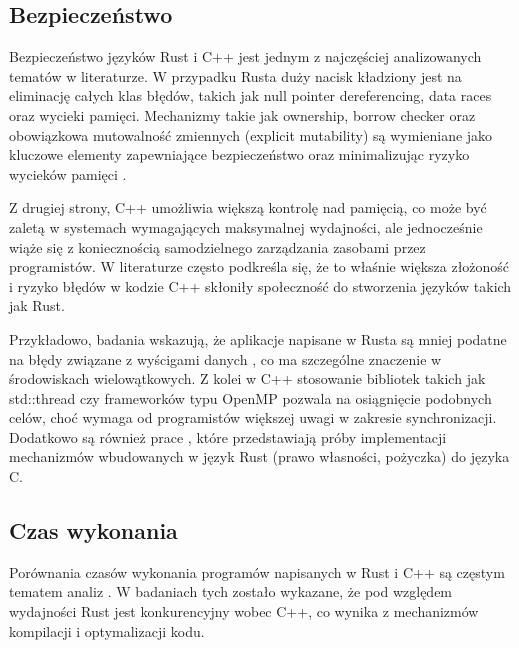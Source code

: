 \subsection{Bezpieczeństwo}
\label{Bezpieczeństwo}
Bezpieczeństwo języków Rust i C++ jest jednym z najczęściej analizowanych tematów w literaturze. W przypadku Rusta duży nacisk kładziony jest na eliminację całych klas błędów, takich jak null pointer dereferencing, data races oraz wycieki pamięci. Mechanizmy takie jak ownership, borrow checker oraz obowiązkowa mutowalność zmiennych (explicit mutability) są wymieniane jako kluczowe elementy zapewniające bezpieczeństwo oraz minimalizując ryzyko wycieków pamięci \cite{MigratingCtoRustforMemorySafety}. 

Z drugiej strony, C++ umożliwia większą kontrolę nad pamięcią, co może być zaletą w systemach wymagających maksymalnej wydajności, ale jednocześnie wiąże się z koniecznością samodzielnego zarządzania zasobami przez programistów. W literaturze \cite{RustDifferences, RustDifferences1} często podkreśla się, że to właśnie większa złożoność i ryzyko błędów w kodzie C++ skłoniły społeczność do stworzenia języków takich jak Rust.

Przykładowo, badania \cite{RustSafety1, RustSafety2, RustSafety3} wskazują, że aplikacje napisane w Rusta są mniej podatne na błędy związane z wyścigami danych , co ma szczególne znaczenie w środowiskach wielowątkowych. Z kolei w C++ stosowanie bibliotek takich jak std::thread czy frameworków typu OpenMP pozwala na osiągnięcie podobnych celów, choć wymaga od programistów większej uwagi w zakresie synchronizacji. Dodatkowo są również prace \cite{PPL1_1,PPL1_2}, które przedstawiają próby implementacji mechanizmów wbudowanych w język Rust (prawo własności, pożyczka) do języka C.
\subsection{Czas wykonania}
\label{CzasWykonania}
Porównania czasów wykonania programów napisanych w Rust i C++ są częstym tematem analiz \cite{RustPerformance1, RustPerformance2, RustPerformance3, RustPerformance4}. W badaniach tych zostało wykazane, że pod względem wydajności Rust jest konkurencyjny wobec C++, co wynika z mechanizmów kompilacji i optymalizacji kodu.

